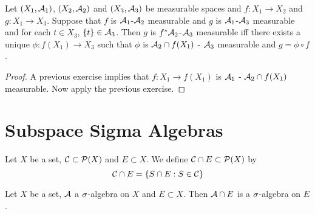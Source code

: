 \documentclass{book}
\begin{document}
	\begin{ex} 
		Let $(X_1, \mathcal{A}_1)$, $(X_2, \mathcal{A}_2)$ and $(X_3, \mathcal{A}_3)$ be measurable spaces and $f: X_1 \rightarrow X_2$ and $g:X_1 \rightarrow X_3$. Suppose that $f$ is $\mathcal{A}_1$-$\mathcal{A}_2$ measurable and $g$ is $\mathcal{A}_1$-$\mathcal{A}_3$ measurable and for each $t \in X_3$, $\{t\} \in \mathcal{A}_3$. Then $g$ is $f^*\mathcal{A}_2$-$\mathcal{A}_3$ measurable iff there exists a unique $\phi: f(X_1) \rightarrow X_3$ such that $\phi$ is $\mathcal{A}_2 \cap f(X_1)$ - $\mathcal{A}_3$ measurable and $g = \phi \circ f$. \\
	\end{ex}
	
	\begin{proof}
		A previous exercise implies that $f: X_1 \rightarrow f(X_1)$ is $\mathcal{A}_1$ - $\mathcal{A}_2 \cap f(X_1)$ measurable. Now apply the previous exercise. 
	\end{proof}


	
	
	
	
	
	
	
	
	
	
	
	
	
	
	
	
	
	
	
	
	
	
	
	
	
	\newpage
	\section{Subspace Sigma Algebras}
	\begin{defn}  
		Let $X$ be a set, $\mathcal{C} \subset \mathcal{P}(X)$ and $E \subset X$. We define $\mathcal{C} \cap E \subset \mathcal{P}(X)$ by $$\mathcal{C} \cap E = \{S \cap E: S \in \mathcal{C}\}$$ 
	\end{defn}
	
	\begin{ex}  
		Let $X$ be a set, $\mathcal{A}$ a $\sigma$-algebra on $X$ and $E \subset X$. Then 
		$\mathcal{A} \cap E$ is a $\sigma$-algebra on $E$. 
	\end{ex}
	
\end{document}
